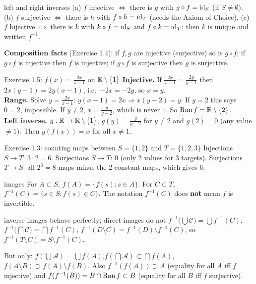 \begin{thm}{left and right inverses}
(a) $f$ injective $\iff$ there is $g$ with $g\circ f=\operatorname{id}_S$ (if $S\ne\emptyset$).
(b) $f$ surjective $\iff$ there is $h$ with $f\circ h=\operatorname{id}_T$ (needs the Axiom of Choice).
(c) $f$ bijective $\iff$ there is $k$ with $k\circ f=\operatorname{id}_S$ and $f\circ k=\operatorname{id}_T$; then $k$ is
unique and written $f^{-1}$.
\end{thm}

\textbf{Composition facts} (Exercise 1.4): if $f,g$ are injective (surjective) so is $g\circ f$;
if $g\circ f$ is injective then $f$ is injective; if $g\circ f$ is surjective then $g$ is
surjective.

\begin{example}{Exercise 1.5: $f(x)=\frac{2x}{x-1}$ on $\mathbb R\setminus\{1\}$}
\textbf{Injective.} If $\frac{2x}{x-1}=\frac{2y}{y-1}$ then $2x(y-1)=2y(x-1)$, i.e.\
$-2x=-2y$, so $x=y$.\\
\textbf{Range.} Solve $y=\frac{2x}{x-1}$: $y(x-1)=2x\Rightarrow x(y-2)=y$. If $y=2$ this says
$0=2$, impossible. If $y\ne2$, $x=\frac{y}{y-2}$, which is never $1$. So $\operatorname{Ran} f=\mathbb R\setminus\{2\}$.\\
\textbf{Left inverse.} $g:\mathbb R\to\mathbb R\setminus\{1\}$, $g(y)=\frac{y}{y-2}$ for $y\ne2$ and $g(2)=0$
(any value $\ne1$). Then $g(f(x))=x$ for all $x\ne1$.
\end{example}

\begin{example}{Exercise 1.3: counting maps between $S=\{1,2\}$ and $T=\{1,2,3\}$}
Injections $S\to T$: $3\cdot2=6$. Surjections $S\to T$: $0$ (only 2 values for 3 targets).
Surjections $T\to S$: all $2^3=8$ maps minus the 2 constant maps, which gives $6$.
\end{example}

\begin{defn}{images}
For $A\subset S$, $f(A)=\{f(s):s\in A\}$. For $C\subset T$, $f^{-1}(C)=\{s\in S: f(s)\in C\}$.
The notation $f^{-1}(C)$ does \textbf{not} mean $f$ is invertible.
\end{defn}

\begin{thm}{inverse images behave perfectly; direct images do not}
$f^{-1}\big(\bigcup\mathcal C\big)=\bigcup f^{-1}(C)$,\quad
$f^{-1}\big(\bigcap\mathcal C\big)=\bigcap f^{-1}(C)$,\quad
$f^{-1}(D\setminus C)=f^{-1}(D)\setminus f^{-1}(C)$, so $f^{-1}(T\setminus C)=S\setminus f^{-1}(C)$.

But only: $f(\bigcup\mathcal A)=\bigcup f(A)$,\quad $f(\bigcap\mathcal A)\subset\bigcap f(A)$,\quad
$f(A\setminus B)\supset f(A)\setminus f(B)$. Also $f^{-1}(f(A))\supset A$ (equality for all $A$
iff $f$ injective) and $f(f^{-1}(B))=B\cap\operatorname{Ran} f\subset B$ (equality for all $B$ iff $f$
surjective).
\end{thm}

